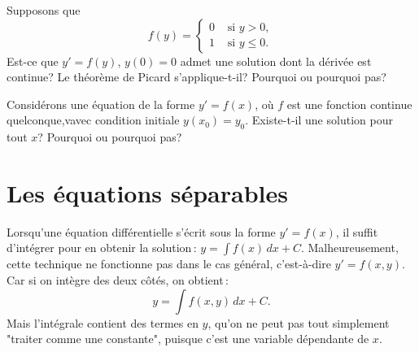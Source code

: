 \begin{exercise}[défi]
Supposons que 
\begin{equation*}
f(y) =
\begin{cases}
0 & \text{ si $y > 0$}, \\
1 & \text{ si $y \leq 0$} .
\end{cases}
\end{equation*}
Est-ce que $y' = f(y)$, $y(0) = 0$ admet une solution dont la dérivée est continue?  Le théorème de Picard s'applique-t-il?  Pourquoi ou pourquoi pas?
\end{exercise}
 
\begin{exercise}
Considérons une équation de la forme $y' = f(x)$, où $f$ est une fonction continue quelconque,vavec condition initiale $y(x_0) = y_0$.  Existe-t-il une solution pour tout $x$?  Pourquoi ou pourquoi pas?

\end{exercise}


\sectionnewpage
\section{Les équations séparables}
\label{separable:section}


Lorsqu'une équation différentielle s'écrit sous la forme 
$y' = f(x)$,
il suffit d'intégrer pour en obtenir la solution\,:
$y = \int f(x) \,dx + C$. 
Malheureusement, cette technique ne fonctionne pas dans le cas général, c'est-à-dire 
$y' = f(x,y)$.
Car si on intègre des deux côtés, on obtient\,: 
\begin{equation*}
y = \int f(x,y) \,dx + C .
\end{equation*}
Mais l'intégrale contient des termes en $y$, qu'on ne peut pas tout simplement "traiter comme une constante", puisque c'est une variable dépendante de $x$.

